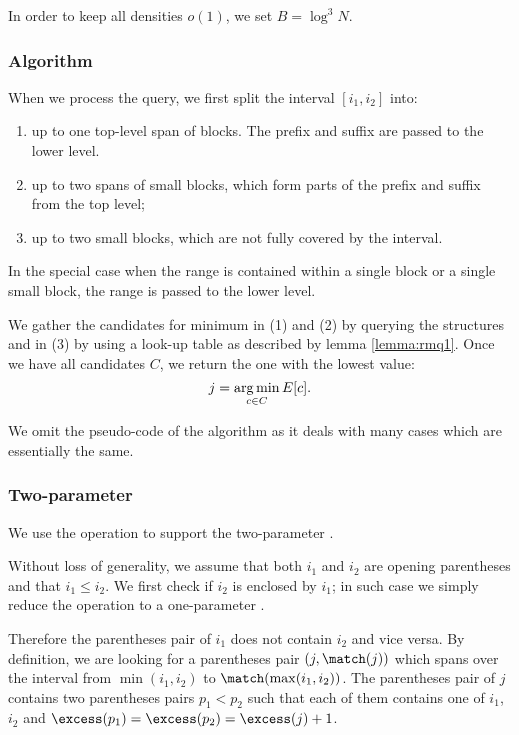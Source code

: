 In order to keep all densities $o(1)$, we set $B = \log^3 N$.

\subsubsection{Algorithm}

When we process the query, we first split the interval $[i_1, i_2]$ into:
\begin{enumerate}
	\item up to one top-level span of blocks.
	The prefix and suffix are passed to the lower level.
	\item up to two spans of small blocks, which form parts of the prefix and suffix from the top level;
	\item up to two small blocks, which are not fully covered by the interval.
\end{enumerate}
In the special case when the range is contained within a single block or a single small block, the range is passed to the lower level.

We gather the candidates for minimum in (1) and (2) by querying the \rmqi{} structures and in (3) by using a look-up table as described by lemma \ref{lemma:rmq1}.
Once we have all candidates $C$, we return the one with the lowest value:
$$ j = \operatorname*{arg\,min}_{c \in C} E[c]. $$

We omit the pseudo-code of the algorithm as it deals with many cases which are essentially the same.

\subsubsection{\label{ss:enclose2}Two-parameter \enclose}

We use the operation \rmqi{} to support the two-parameter \enclose{}.

Without loss of generality, we assume that both $i_1$ and $i_2$ are opening parentheses and that $i_1 \le i_2$.
We first check if $i_2$ is enclosed by $i_1$; in such case we simply reduce the operation to a one-parameter \enclose{}.

Therefore the parentheses pair of $i_1$ does not contain $i_2$ and vice versa.
By definition, we are looking for a parentheses pair $(j, \match(j))$ which spans over the interval from $\min(i_1, i_2)$ to $\match(\max(i_1, i_2))$.
The parentheses pair of $j$ contains two parentheses pairs $p_1 < p_2$ such that each of them contains one of $i_1$, $i_2$ and $\excess(p_1) = \excess(p_2) = \excess(j) + 1$.

